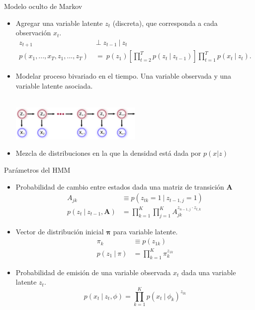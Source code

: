 \begin{frame}{Modelo oculto de Markov}
  \begin{itemize}
    \itemsep1em
    \item Agregar una variable latente $z_t$ (discreta), que corresponda a cada observación $x_t$.
      \begin{align}
        z_{t+1} &\perp z_{t-1} ~|~ z_{t} \\
        p(x_1, ..., x_T, z_1, ..., z_T) &~=~ p(z_1) \left [ \prod_{t=2}^T p(z_t ~|~ z_{t-1}) \right ] 
          \prod_{t=1}^T p(x_t ~|~ z_{t}).
      \end{align}

    \item Modelar proceso bivariado en el tiempo. Una variable observada y una variable latente asociada.
      \\~\\
      \begin{center}
        \includegraphics[width=0.5\textwidth]{gfx/mod-hmm}
      \end{center}    
      
    \item Mezcla de distribuciones en la que la densidad está dada por $p(x | z)$      
  \end{itemize}
\end{frame}

\begin{frame}{Parámetros del HMM}
  \begin{itemize}
    \item Probabilidad de cambio entre estados dada una \alert{matriz de transición} $\mathbf{A}$
      \begin{align}
        A_{jk} &\equiv p(z_{tk} = 1 ~|~  z_{t-1, j} = 1) \\
        p(z_t ~|~ z_{t-1}, \mathbf{A}) &= \prod_{k=1}^K \prod_{j=1}^K A_{jk}^{z_{{n-1}, j} \cdot z_{t,k}}
      \end{align}      
    \item \alert{Vector de distribución inicial} $\bm{\pi}$ para variable latente.
      \begin{align}
        \pi_k &\equiv p(z_{1k}) \\
        p(z_1 ~|~ \pi) &= \prod_{k=1}^K \pi_k^{z_{1k}}
      \end{align}       
    \item \alert{Probabilidad de emisión} de una variable observada $x_t$ dada una variable latente $z_t$.
      \begin{equation}
        p(x_t ~|~ z_t, \phi) = \prod_{k=1}^K p(x_t ~|~ \phi_k) ^ {z_{tk}}
      \end{equation}
  \end{itemize}
\end{frame}

